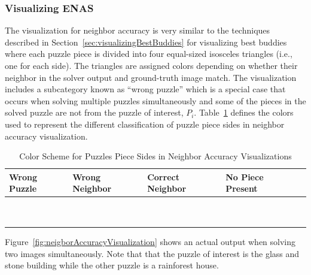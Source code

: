 \documentclass{report}
\begin{document}
\subsubsection{Visualizing ENAS}\label{sec:visualizingNeighborAccuracy}

The visualization for neighbor accuracy is very similar to the techniques described in Section~\ref{sec:visualizingBestBuddies} for visualizing best buddies where each puzzle piece is divided into four equal-sized isosceles triangles (i.e., one for each side).  The triangles are assigned colors depending on whether their neighbor in the solver output and ground-truth image match.  The visualization includes a subcategory known as ``wrong puzzle'' which is a special case that occurs when solving multiple puzzles simultaneously and some of the pieces in the solved puzzle are not from the puzzle of interest, $P_i$.  Table~\ref{tab:neighborAccuracyColors} defines the colors used to represent the different classification of puzzle piece sides in neighbor accuracy visualization.

\begin{table}[h]
\begin{center}
  \begin{tabular}{ | >{\centering\arraybackslash}m{0.6in} | >{\centering\arraybackslash}m{0.6in} | >{\centering\arraybackslash}m{0.6in} | >{\centering\arraybackslash}m{0.6in} | >{\centering\arraybackslash}m{0.6in} | }
 \hline
    Wrong Puzzle & Wrong Neighbor & Correct Neighbor  & No Piece Present  \\ \hline
	{\cellcolor{blue}~} & {\cellcolor{red}~} & {\cellcolor{green}~} & {\cellcolor{black}~}  \\
	{\cellcolor{blue}~} & {\cellcolor{red}~} & {\cellcolor{green}~} & {\cellcolor{black}~}  \\
 \hline
  \end{tabular}
\end{center}
\caption{Color Scheme for Puzzles Piece Sides in Neighbor Accuracy Visualizations}\label{tab:neighborAccuracyColors}
\end{table}

Figure~\ref{fig:neigborAccuracyVisualization} shows an actual output when solving two images simultaneously.  Note that that the puzzle of interest is the glass and stone building while the other puzzle is a rainforest house.
\end{document}
